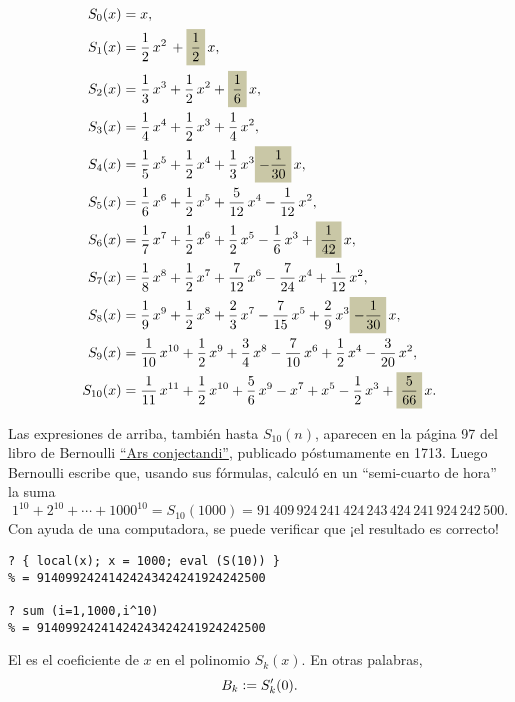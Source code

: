\documentclass{article}
\newcommand{\highlight}[1]{\colorbox{shadecolor}{$\displaystyle #1$}}
\begin{document}
\begin{align*}
S_0 (x) & = x,\\
S_1 (x) & = \frac{1}{2}\,x^2\,+\highlight{\frac{1}{2}}\,x,\\
S_2 (x) & = \frac{1}{3}\,x^3+\frac{1}{2}\,x^2+\highlight{\frac{1}{6}}\,x,\\
S_3 (x) & = \frac{1}{4}\,x^4+\frac{1}{2}\,x^3+\frac{1}{4}\,x^2,\\
S_4 (x) & = \frac{1}{5}\,x^5+\frac{1}{2}\,x^4+\frac{1}{3}\,x^3\highlight{-\frac{1}{30}}\,x,\\
S_5 (x) & = \frac{1}{6}\,x^6+\frac{1}{2}\,x^5+\frac{5}{12}\,x^4-\frac{1}{12}\,x^2,\\
S_6 (x) & = \frac{1}{7}\,x^7+\frac{1}{2}\,x^6+\frac{1}{2}\,x^5-\frac{1}{6}\,x^3+\highlight{\frac{1}{42}}\,x,\\
S_7 (x) & = \frac{1}{8}\,x^8+\frac{1}{2}\,x^7+\frac{7}{12}\,x^6-\frac{7}{24}\,x^4+\frac{1}{12}\,x^2,\\
S_8 (x) & = \frac{1}{9}\,x^9+\frac{1}{2}\,x^8+\frac{2}{3}\,x^7-\frac{7}{15}\,x^5+\frac{2}{9}\,x^3\highlight{-\frac{1}{30}}\,x,\\
S_9 (x) & = \frac{1}{10}\,x^{10}+\frac{1}{2}\,x^9+\frac{3}{4}\,x^8-\frac{7}{10}\,x^6+\frac{1}{2}\,x^4-\frac{3}{20}\,x^2,\\
S_{10} (x) & = \frac{1}{11}\,x^{11}+\frac{1}{2}\,x^{10}+\frac{5}{6}\,x^9-x^7+x^5-\frac{1}{2}\,x^3+\highlight{\frac{5}{66}}\,x.
\end{align*}

Las expresiones de arriba, también hasta $S_{10} (n)$, aparecen en la página 97 del libro de Bernoulli \href{http://books.google.com/books?id=kD4PAAAAQAAJ}{``Ars conjectandi''}, publicado póstumamente en 1713. Luego Bernoulli escribe que, usando sus fórmulas, calculó en un ``semi-cuarto de hora'' la suma
$$1^{10} + 2^{10} + \cdots + 1000^{10} = S_{10} (1000) = 91\,409\,924\,241\,424\,243\,424\,241\,924\,242\,500.$$
Con ayuda de una computadora, se puede verificar que ¡el resultado es correcto!

\begin{shaded}
\small
\begin{verbatim}
? { local(x); x = 1000; eval (S(10)) }
% = 91409924241424243424241924242500

? sum (i=1,1000,i^10)
% = 91409924241424243424241924242500
\end{verbatim}
\end{shaded}

\begin{definicion*}
El  es el coeficiente de $x$ en el polinomio $S_k (x)$. En otras palabras,
$$B_k \mathrel{\mathop:}= S_k' (0).$$
\end{definicion*}
\end{document}
